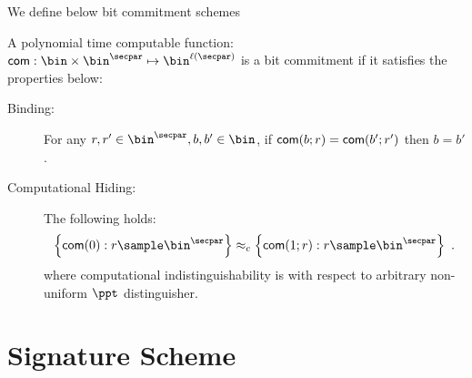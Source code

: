 	We define below bit commitment schemes
	\begin{definition}
		A polynomial time computable function: $\com: \bin \times \bin^\secpar \mapsto \bin^{\ell(\secpar)}$ is a bit commitment if it satisfies the properties below:
		\begin{description}
			\item[Binding:] For any $r,r' \in \bin^\secpar, b,b' \in \bin$, if $\mathsf{com}(b;r)=\mathsf{com}(b';r')$ then $b=b'$.
			\item[Computational Hiding:] The following holds:
			\[
				\Big\lbrace \com(0):r \sample \bin^\secpar \Big\rbrace \approx_c \Big\lbrace \com(1;r):r \sample \bin^\secpar \Big\rbrace \enspace.
			\]			
			where computational indistinguishability is with respect to arbitrary non-uniform $\ppt$ distinguisher.
		\end{description}
		
	\end{definition}


	\section{Signature Scheme}
		
	
	
